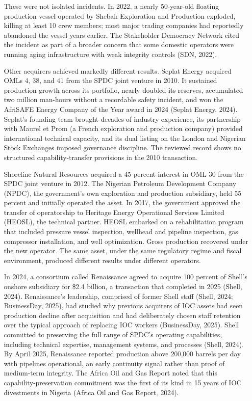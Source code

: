 \documentclass[twoside,fontset=lmodern]{mitthesis}
\begin{document}
These were not isolated incidents. In 2022, a nearly 50-year-old
floating production vessel operated by Shebah Exploration and Production
exploded, killing at least 10 crew members; most major trading companies
had reportedly abandoned the vessel years earlier. The Stakeholder
Democracy Network cited the incident as part of a broader concern that
some domestic operators were running aging infrastructure with weak
integrity controls (SDN, 2022).

Other acquirers achieved markedly different results. Seplat Energy
acquired OMLs 4, 38, and 41 from the SPDC joint venture in 2010. It
sustained production growth across its portfolio, nearly doubled its
reserves, accumulated two million man-hours without a recordable safety
incident, and won the AfriSAFE Energy Company of the Year award in 2024
(Seplat Energy, 2024). Seplat's founding team brought decades of
industry experience, its partnership with Maurel et Prom (a French
exploration and production company) provided international technical
capacity, and its dual listing on the London and Nigerian Stock
Exchanges imposed governance discipline. The reviewed record shows no
structured capability-transfer provisions in the 2010 transaction.

Shoreline Natural Resources acquired a 45 percent interest in OML 30
from the SPDC joint venture in 2012. The Nigerian Petroleum Development
Company (NPDC), the government's own exploration and production
subsidiary, held 55 percent and initially operated the asset. In 2017,
the government approved the transfer of operatorship to Heritage Energy
Operational Services Limited (HEOSL), the technical partner. HEOSL
embarked on a rehabilitation program that included pressure vessel
inspection, wellhead and pipeline inspection, gas compressor
installation, and well optimization. Gross production recovered under
the new operator. The same asset, under the same regulatory regime and
fiscal environment, produced different results under different
operators.

In 2024, a consortium called Renaissance agreed to acquire 100 percent
of Shell's onshore subsidiary for \$2.4 billion, a transaction that
completed in 2025 (Shell, 2024). Renaissance's leadership, comprised of
former Shell staff (Shell, 2024; BusinessDay, 2025), had studied why
previous acquirers of IOC assets had seen production decline after
acquisition and had deliberately chosen staff retention over the typical
approach of replacing IOC workers (BusinessDay, 2025). Shell committed
to preserving the full range of SPDC's operating capabilities, including
technical expertise, management systems, and processes (Shell, 2024). By
April 2025, Renaissance reported production above 200,000 barrels per
day with pipelines operational, an early continuity signal rather than
proof of medium-term integrity. The Africa Oil and Gas Report noted that
this capability-preservation commitment was the first of its kind in 15
years of IOC divestments in Nigeria (Africa Oil and Gas Report, 2024).
\end{document}

